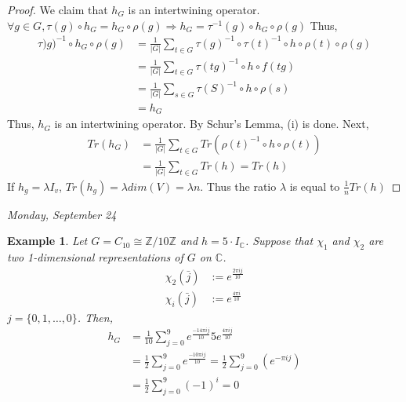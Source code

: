 \documentclass[letterpaper, leqno, 12pt]{article}
\newcommand{\fin}{\qquad \quad \hfill \framebox[1.75mm][l]{\,}}
\newcommand{\bZ}{\mathbb{Z}}
\providecommand{\abs}[1]{\left\lvert#1\right\rvert}
\newcommand{\bC} {\mathbb{C}}
\theoremstyle{stdthm}
\theoremstyle{stddef}
\newtheorem{eg}[thm]{Example} %
\theoremstyle{stdnonum}
\theoremstyle{stdqands}
\theoremstyle{stdbold}
\begin{document}
\begin{proof}
We claim that $h_G$ is an intertwining operator. 
$\forall g \in G, \tau(g) \circ h_G = h_G \circ \rho(g) \Rightarrow h_G =  \tau^{-1}(g)\circ h_G \circ \rho(g)$ Thus, 
\begin{align*}
\tau)g)^{-1} \circ h_G \circ \rho(g) &= \frac{1}{\abs{G}} \sum_{t\in G} \tau(g)^{-1} \circ \tau(t)^{-1} \circ h \circ \rho(t) \circ \rho(g)\\
&= \frac{1}{\abs{G}}\sum_{t\in G} \tau(tg)^{-1} \circ h \circ f(tg)\\
&= \frac{1}{\abs{G}} \sum_{s \in G} \tau(S)^{-1} \circ h \circ \rho(s)\\
&= h_G
\end{align*}
Thus, $h_G$ is an intertwining operator. By Schur's Lemma, (i) is done. Next,
\begin{align*}
Tr(h_G) &= \frac{1}{\abs{G}} \sum_{t\in G} Tr(\rho(t)^{-1} \circ h \circ \rho(t))\\
&= \frac{1}{\abs{G}} \sum_{t\in G} Tr(h) = Tr(h)
\end{align*}
If $h_g = \lambda I_v$, $Tr(h_g) = \lambda dim(V) = \lambda n$. Thus the ratio $\lambda$ is equal to $\frac{1}{n}Tr(h)$
\end{proof}

\begin{center}
\emph{Monday, September 24}
\end{center}

\begin{eg}
Let $G = C_{10} \cong \bZ/10\bZ$ and $h=5 \cdot I_{\bC}$. Suppose that $\chi_1$ and $\chi_2$ are two 1-dimensional representations of $G$ on $\bC$. 
\begin{align*}
\chi_2(\bar{j}) &:= e^{\frac{2\pi i j}{10}}\\
\chi_i(\bar{j}) &:= e^{\frac{4\pi i }{10}}
\end{align*}
$j = \{0,1,\dots,0\}$. Then,
\begin{align*}
h_G &= \frac{1}{10} \sum_{j=0}^9 e^{\frac{-14\pi i j}{10}} 5e^{\frac{4\pi i j}{10}}\\
&= \frac{1}{2} \sum_{j=0}^9 e^{\frac{-10\pi i j}{10}} = \frac{1}{2}\sum_{j=0}^9 \left( e^{-\pi i j} \right)\\
&= \frac{1}{2}\sum_{j=0}^9 (-1)^i = 0
\end{align*} 
\end{eg}
\end{document}
